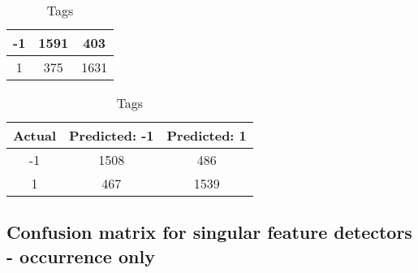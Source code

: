 \begin{table}[!htb]
\begin{minipage}{.5\linewidth}
\begin{tabular}{| c | c | c |}
			-1			& 1591			& 403			\\ \hline
			1			& 375			& 1631			\\ \hline
		\end{tabular}
	\end{minipage} 	
	\begin{minipage}{.5\linewidth}
		\caption{Tags}
		\centering
		\begin{tabular}{| c | c | c |}
			\hline
			Actual 		& Predicted: -1	& Predicted: 1	\\ \hline
			-1			& 1508			& 486			\\ \hline
			1			& 467			& 1539			\\ \hline
		\end{tabular}
	\end{minipage}%
\end{table}	

\clearpage
\subsection{Confusion matrix for singular feature detectors - occurrence only}

